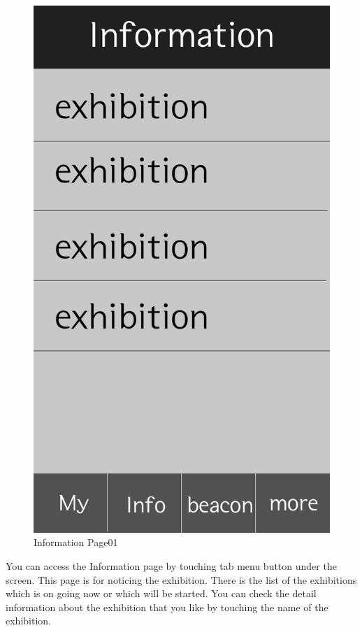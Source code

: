 \documentclass[conference]{IEEEtran}
\begin{document}
\begin{figure}[htbp]
\begin{center}
    \includegraphics[scale=0.15]{img_information}
    \caption{Information Page01} 
\end{center}
\end{figure}

You can access the Information page by touching tab menu button under the screen. This page is for noticing the exhibition. There is the list of the exhibitions which is on going now or which will be started. You can check the detail information about the exhibition that you like by touching the name of the exhibition. \\
\end{document}
